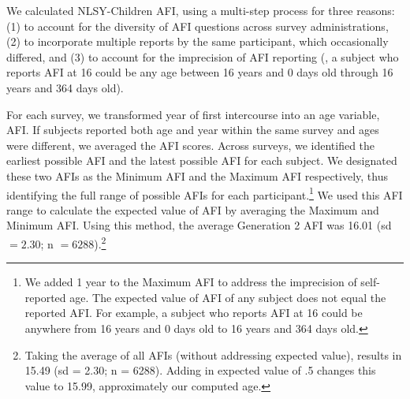 \documentclass[a4paper,man,apacite,natbib,12pt,longtable]{apa6}\usepackage[]{graphicx}\usepackage[]{color}
\begin{document}
We calculated NLSY-Children AFI, using a multi-step process for three reasons: (1) to account for the diversity of AFI questions across survey administrations, (2) to incorporate multiple reports by the same participant, which occasionally differed, and (3) to account for the imprecision of AFI reporting (\eg, a subject who reports AFI at 16 could be any age between 16 years and 0 days old through 16 years and 364 days old).

For each survey, we transformed year of first intercourse into an age variable, AFI. If subjects reported both age and year within the same survey and ages were different, we averaged the AFI scores. Across surveys, we identified the earliest possible AFI and the latest possible AFI for each subject. We designated these two AFIs as the Minimum AFI and the Maximum AFI respectively, thus identifying the full range of possible AFIs for each participant.\footnote{We added 1 year to the Maximum AFI to address the imprecision of self-reported age. The expected value of AFI of any subject does not equal the reported AFI. For example, a subject who reports AFI at 16 could be anywhere from 16 years and 0 days old to 16 years and 364 days old.} We used this AFI range to calculate the expected value of AFI by averaging the Maximum and Minimum AFI. Using this method, the average Generation 2 AFI was 16.01 (sd $= 2.30$; n $= 6288$).\footnote{Taking the average of all AFIs (without addressing expected value), results in 15.49 (sd = 2.30; n = 6288). Adding in expected value of .5 changes this value to 15.99, approximately our computed age.}
\end{document}
